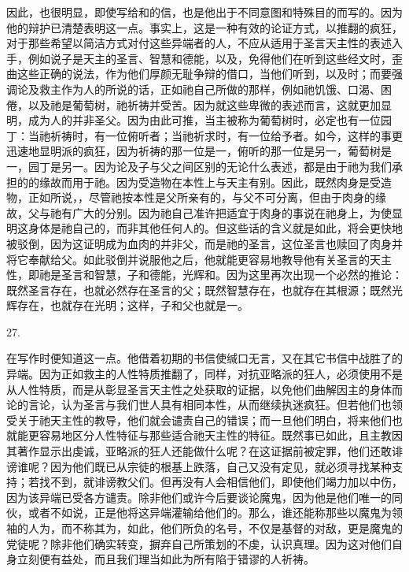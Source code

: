 因此，也很明显，即使写给和的信，也是他出于不同意图和特殊目的而写的。因为他的辩护已清楚表明这一点。事实上，这是一种有效的论证方式，以推翻的疯狂，对于那些希望以简洁方式对付这些异端者的人，不应从适用于圣言天主性的表述入手，例如说子是天主的圣言、智慧和德能，以及，免得他们在听到这些经文时，歪曲这些正确的说法，作为他们厚颜无耻争辩的借口，当他们听到，以及时；而要强调论及救主作为人的所说的话，正如祂自己所做的那样，例如祂饥饿、口渴、困倦，以及祂是葡萄树，祂祈祷并受苦。因为就这些卑微的表述而言，这就更加显明，成为人的并非圣父。因为由此可推，当主被称为葡萄树时，必定也有一位园丁：当祂祈祷时，有一位俯听者；当祂祈求时，有一位给予者。如今，这样的事更迅速地显明派的疯狂，因为祈祷的那一位是一，俯听的那一位是另一，葡萄树是一，园丁是另一。因为论及子与父之间区别的无论什么表述，都是由于祂为我们承担的的缘故而用于祂。因为受造物在本性上与天主有别。因此，既然肉身是受造物，正如所说，，尽管祂按本性是父所亲有的，与父不可分离，但由于肉身的缘故，父与祂有广大的分别。因为祂自己准许把适宜于肉身的事说在祂身上，为使显明这身体是祂自己的，而非其他任何人的。但这些话的含义就是如此，将会更快地被驳倒，因为这证明成为血肉的并非父，而是祂的圣言，这位圣言也赎回了肉身并将它奉献给父。如此驳倒并说服他之后，他就能更容易地教导他有关圣言的天主性，即祂是圣言和智慧，子和德能，光辉和。因为这里再次出现一个必然的推论：既然圣言存在，也就必然存在圣言的父；既然智慧存在，也就存在其根源；既然光辉存在，也就存在光明；这样，子和父也就是一。\par

27. \par

在写作时便知道这一点。他借着初期的书信使缄口无言，又在其它书信中战胜了的异端。因为正如救主的人性特质推翻了，同样，对抗亚略派的狂人，必须使用不是从人性特质，而是从彰显圣言天主性之处获取的证据，以免他们曲解因主的身体而论的言论，认为圣言与我们世人具有相同本性，从而继续执迷疯狂。但若他们也领受关于祂天主性的教导，他们就会谴责自己的错误；而一旦他们明白，将来他们也就能更容易地区分人性特征与那些适合祂天主性的特征。既然事已如此，且主教因其著作显示出虔诚，亚略派的狂人还能做什么呢？在这证据前被定罪，他们还敢诽谤谁呢？因为他们既已从宗徒的根基上跌落，自己又没有定见，就必须寻找某种支持；若找不到，就诽谤教父们。但再没有人会相信他们，即使他们竭力加以中伤，因为该异端已受各方谴责。除非他们或许今后要谈论魔鬼，因为他是他们唯一的同伙，或者不如说，正是他将这异端灌输给他们的。那么，谁还能称那些以魔鬼为领袖的人为，而不称其为，如此，他们所负的名号，不仅是基督的对敌，更是魔鬼的党徒呢？除非他们确实转变，摒弃自己所策划的不虔，认识真理。因为这对他们自身立刻便有益处，而且我们理当如此为所有陷于错谬的人祈祷。\par

